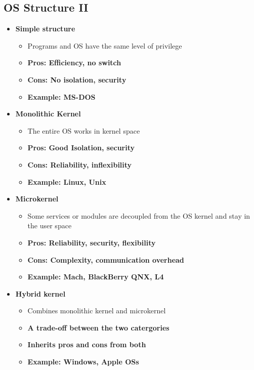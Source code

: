 \documentclass{article}
\begin{document}
\subsection{OS Structure II}
\begin{itemize}
    \item \textbf{\large{\color{white!60!green}Simple structure}}
        \begin{itemize}[-]
            \item Programs and OS have the same level of privilege
            \item \textbf{\color{blue!45!white}Pros: Efficiency, no switch}
            \item \textbf{\color{red!45!white}Cons: No isolation, security}
            \item \textbf{Example: MS-DOS}  
        \end{itemize}
    \item \textbf{\large{\color{white!60!yellow}Monolithic Kernel}}
        \begin{itemize}[-]
            \item The entire OS works in kernel space
            \item \textbf{\color{blue!45!white}Pros: Good Isolation, security}
            \item \textbf{\color{red!45!white}Cons: Reliability, inflexibility}
            \item \textbf{Example: Linux, Unix} 
        \end{itemize}
    \item \textbf{\large{\color{white!60!purple}Microkernel}}
        \begin{itemize}[-]
            \item Some services or modules are decoupled from the OS kernel and stay in the user space
            \item \textbf{\color{blue!45!white}Pros: Reliability, security, flexibility}
            \item \textbf{\color{red!45!white}Cons: Complexity, communication overhead}
            \item \textbf{Example: Mach, BlackBerry QNX, L4} 
        \end{itemize}
    \item \textbf{\large{\color{white!60!cyan}Hybrid kernel}}
        \begin{itemize}[-]
            \item Combines monolithic kernel and microkernel
            \item \textbf{\color{blue!45!white}A trade-off between the two catergories}
            \item \textbf{\color{red!45!white}Inherits pros and cons from both}
            \item \textbf{Example: Windows, Apple OSs} 
        \end{itemize}
\end{itemize}
\end{document}
